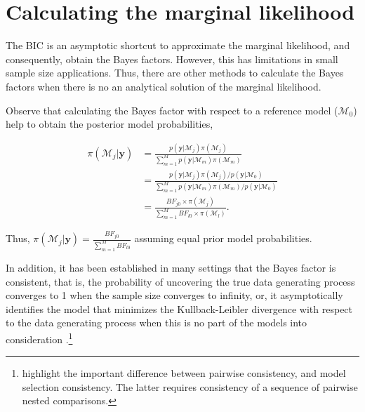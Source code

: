 
\section{Calculating the marginal likelihood}\label{sec10_6}

The BIC is an asymptotic shortcut to approximate the marginal likelihood, and consequently, obtain the Bayes factors. However, this has limitations in small sample size applications. Thus, there are other methods to calculate the Bayes factors when there is no an analytical solution of the marginal likelihood.

Observe that calculating the Bayes factor with respect to a reference model ($\mathcal{M}_0$) help to obtain the posterior model probabilities,

\begin{align*}
	\pi(\mathcal{M}_j |\bm{y})&=\frac{p(\bm{y} | \mathcal{M}_j)\pi(\mathcal{M}_j)}{\sum_{m=1}^{M}p(\bm{y} | \mathcal{M}_m)\pi(\mathcal{M}_m)}\\
	&=\frac{p(\bm{y} | \mathcal{M}_j)\pi(\mathcal{M}_j)/p(\bm{y} | \mathcal{M}_0)}{\sum_{m=1}^{M}p(\bm{y} | \mathcal{M}_m)\pi(\mathcal{M}_m)/p(\bm{y} | \mathcal{M}_0)}\\
	&=\frac{BF_{j0}\times\pi(\mathcal{M}_j)}{\sum_{m=1}^{M}BF_{l0}\times\pi(\mathcal{M}_l)}.
\end{align*}

Thus, $\pi(\mathcal{M}_j |\bm{y})=\frac{BF_{j0}}{\sum_{m=1}^{M}BF_{l0}}$ assuming equal prior model probabilities.

In addition, it has been established in many settings that the Bayes factor is consistent, that is, the probability of uncovering the true data generating process converges to 1 when the sample size converges to infinity, or, it asymptotically identifies the model that minimizes the Kullback-Leibler divergence with respect to the data generating process when this is no part of the models into consideration \cite{chib2016bayes,walker2004new,walker2004modern}.\footnote{\cite{Johnson2012} highlight the important difference between pairwise consistency, and model selection consistency. The latter requires consistency of a sequence of pairwise nested comparisons.}  

